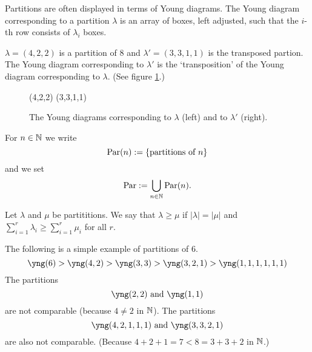 Partitions are often displayed in terms of Young diagrams. The Young diagram corresponding to a partition $\lambda$ is an array of boxes, left adjusted, such that the $i$-th row consists of $\lambda_i$ boxes.


\begin{expl}
 $\lambda = (4,2,2)$ is a partition of $8$ and $\lambda' = (3,3,1,1)$ is the transposed partion. The Young diagram corresponding to $\lambda'$ is the `transposition' of the Young diagram corresponding to $\lambda$. (See figure \ref{fig: Young diagram example}.)
 \begin{figure}
  \centering
  \yng(4,2,2)
  \qquad
  \yng(3,3,1,1)
  \caption{The Young diagrams corresponding to $\lambda$ (left) and to $\lambda'$ (right).}
  \label{fig: Young diagram example}
 \end{figure}
\end{expl}


\begin{defi}
 For $n \in \mathbb{N}$ we write
 \[
  \operatorname{Par}(n) := \{\text{partitions of $n$}\}
 \]
 and we set
 \[
  \operatorname{Par} := \bigcup_{n \in \mathbb{N}} \operatorname{Par}(n).
 \]
\end{defi}
 

\begin{defi}
 Let $\lambda$ and $\mu$ be partititions. We say that $\lambda \geq \mu$ if $|\lambda| = |\mu|$ and $\sum_{i=1}^r \lambda_i \geq \sum_{i=1}^r \mu_i$ for all $r$.
\end{defi}


\begin{expls}
 The following is a simple example of partitions of $6$.
 \[
  \yng(6) > \yng(4,2) > \yng(3,3) > \yng(3,2,1) > \yng(1,1,1,1,1,1)
 \]
 The partitions
 \[
  \yng(2,2) \text{ and } \yng(1,1)
 \]
 are not comparable (because $4 \neq 2$ in $\mathbb{N}$). The partitions
 \[
  \yng(4,2,1,1,1) \text{ and } \yng(3,3,2,1)
 \]
 are also not comparable. (Because $4+2+1 = 7 < 8 = 3+3+2$ in $\mathbb{N}$.)
\end{expls}


